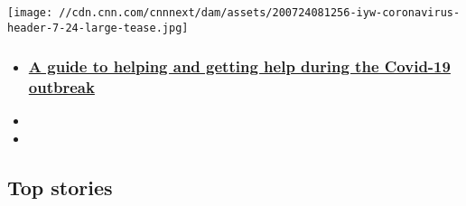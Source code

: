 \href{https://www.cnn.com/interactive/2020/health/coronavirus-how-to-help/}{}

\texttt{[image: //cdn.cnn.com/cnnnext/dam/assets/200724081256-iyw-coronavirus-header-7-24-large-tease.jpg]}

\begin{itemize}
\item
  \hypertarget{a-guide-to-helping-and-getting-help-during-the-covid-19-outbreak}{%
  \subsubsection{\texorpdfstring{\href{https://www.cnn.com/interactive/2020/health/coronavirus-how-to-help/}{A
  guide to helping and getting help during the Covid-19
  outbreak}}{A guide to helping and getting help during the Covid-19 outbreak}}\label{a-guide-to-helping-and-getting-help-during-the-covid-19-outbreak}}
\item
\item
\end{itemize}

\hypertarget{top-stories-}{%
\subsection{Top stories~}\label{top-stories-}}

